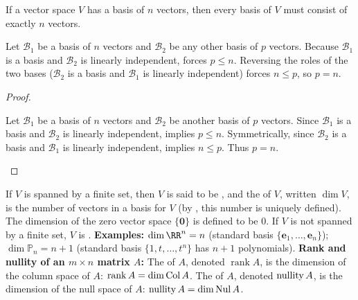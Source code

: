 \documentclass[10pt]{scrartcl}
\newcommand{\vv}[1]{\mathbf{#1}}
\begin{document}
\begin{theorem*}
  If a vector space $V$ has a basis of $n$ vectors, then every basis of $V$ must consist of exactly $n$ vectors.
\end{theorem*}
\begin{ideabox}
  Let $\mathcal{B}_1$ be a basis of $n$ vectors and $\mathcal{B}_2$ be any other basis of $p$ vectors. Because $\mathcal{B}_1$ is a basis and $\mathcal{B}_2$ is linearly independent,  forces $p\le n$. Reversing the roles of the two bases ($\mathcal{B}_2$ is a basis and $\mathcal{B}_1$ is linearly independent) forces $n\le p$, so $p=n$.
\end{ideabox}
\begin{proof}
  \begin{steps}
    \ii Let $\mathcal{B}_1$ be a basis of $n$ vectors and $\mathcal{B}_2$ be another basis of $p$ vectors. Since $\mathcal{B}_1$ is a basis and $\mathcal{B}_2$ is linearly independent,  implies $p\le n$.
    \ii Symmetrically, since $\mathcal{B}_2$ is a basis and $\mathcal{B}_1$ is linearly independent,  implies $n\le p$. Thus $p=n$.
  \end{steps}
\end{proof}

\begin{definition*}
  \begin{itemize}
    \ii If $V$ is spanned by a finite set, then $V$ is said to be , and the  of $V$, written $\dim V$, is the number of vectors in a basis for $V$ (by , this number is uniquely defined). The dimension of the zero vector space $\{\vv 0\}$ is defined to be $0$. If $V$ is not spanned by a finite set, $V$ is .
    \ii \textbf{Examples:} $\dim\RR^n=n$ (standard basis $\{\vv e_1,\dots,\vv e_n\}$); $\dim\mathbb{P}_n=n+1$ (standard basis $\{1,t,\dots,t^n\}$ has $n+1$ polynomials).
    \ii \textbf{Rank and nullity of an $m\times n$ matrix $A$:} The  of $A$, denoted $\operatorname{rank}A$, is the dimension of the column space of $A$: $\operatorname{rank}A=\dim\operatorname{Col} A$. The  of $A$, denoted $\operatorname{nullity} A$, is the dimension of the null space of $A$: $\operatorname{nullity} A=\dim\operatorname{Nul} A$.
  \end{itemize}
\end{definition*}
\end{document}
